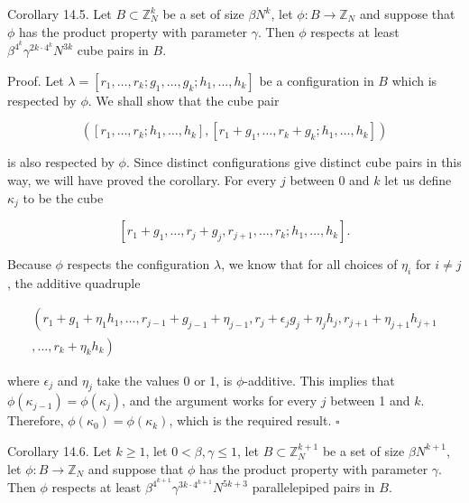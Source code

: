 \documentclass[10pt]{article}
\begin{document}
Corollary 14.5. Let $B \subset \mathbb{Z}_{N}^{k}$ be a set of size $\beta N^{k}$, let $\phi: B \rightarrow \mathbb{Z}_{N}$ and suppose that $\phi$ has the product property with parameter $\gamma$. Then $\phi$ respects at least $\beta^{4^{k}} \gamma^{2 k \cdot 4^{k}} N^{3 k}$ cube pairs in $B$.

Proof. Let $\lambda=\left[r_{1}, \ldots, r_{k} ; g_{1}, \ldots, g_{k} ; h_{1}, \ldots, h_{k}\right]$ be a configuration in $B$ which is respected by $\phi$. We shall show that the cube pair

$$
\left(\left[r_{1}, \ldots, r_{k} ; h_{1}, \ldots, h_{k}\right],\left[r_{1}+g_{1}, \ldots, r_{k}+g_{k} ; h_{1}, \ldots, h_{k}\right]\right)
$$

is also respected by $\phi$. Since distinct configurations give distinct cube pairs in this way, we will have proved the corollary. For every $j$ between 0 and $k$ let us define $\kappa_{j}$ to be the cube

$$
\left[r_{1}+g_{1}, \ldots, r_{j}+g_{j}, r_{j+1}, \ldots, r_{k} ; h_{1}, \ldots, h_{k}\right] .
$$

Because $\phi$ respects the configuration $\lambda$, we know that for all choices of $\eta_{i}$ for $i \neq j$, the additive quadruple

$$
\begin{array}{r}
\left(r_{1}+g_{1}+\eta_{1} h_{1}, \ldots, r_{j-1}+g_{j-1}+\eta_{j-1}, r_{j}+\epsilon_{j} g_{j}+\eta_{j} h_{j}, r_{j+1}+\eta_{j+1} h_{j+1}\right. \\
\left., \ldots, r_{k}+\eta_{k} h_{k}\right)
\end{array}
$$

where $\epsilon_{j}$ and $\eta_{j}$ take the values 0 or 1, is $\phi$-additive. This implies that $\phi\left(\kappa_{j-1}\right)=\phi\left(\kappa_{j}\right)$, and the argument works for every $j$ between 1 and $k$. Therefore, $\phi\left(\kappa_{0}\right)=\phi\left(\kappa_{k}\right)$, which is the required result. \(\square\)

Corollary 14.6. Let $k\geqslant1$, let $0<\beta,\gamma\leqslant1$, let $B \subset \mathbb{Z}_{N}^{k+1}$ be a set of size $\beta N^{k+1}$, let $\phi: B \rightarrow \mathbb{Z}_{N}$ and suppose that $\phi$ has the product property with parameter $\gamma$. Then $\phi$ respects at least $\beta^{4^{k+1}} \gamma^{3k\cdot4^{k+1}} N^{5 k+3}$ parallelepiped pairs in $B$.
\end{document}
